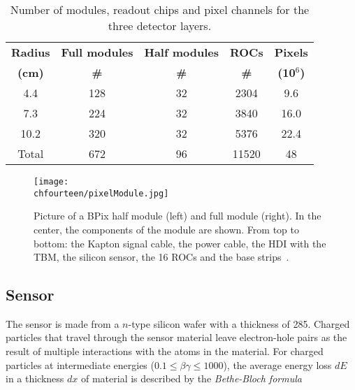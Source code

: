 \begin{table}[!htb]
  \caption{\small Number of modules, readout chips and pixel channels for the three detector layers.}
  \smallskip
  \centering
  \begin{tabular}{|c|c|c|c|c|}
    \hline
    {\bfseries Radius} & {\bfseries Full modules} & {\bfseries Half modules} & {\bfseries ROCs}  & {\bfseries Pixels}  \\
    {\bfseries (cm)}   & {\bfseries \#          } & {\bfseries \#          } & {\bfseries \#  }  & {\bfseries (10$^6$)}\\ \hline \hline
    4.4                & 128                      & 32                       & 2304              & 9.6     \\
    7.3                & 224                      & 32                       & 3840              & 16.0      \\ 
    10.2               & 320                      & 32                       & 5376              & 22.4    \\
    Total              & 672                      & 96                       & 11520             & 48      \\ \hline
  \end{tabular}
  \label{tab:Nmodules}
\end{table}

\begin{figure}[!htb]
 \begin{center}
 \texttt{[image: \\chfourteen/pixelModule.jpg]}
 \end{center}
 \caption{Picture of a BPix half module (left) and full module (right). In the center, the components of the module are shown. From top to bottom: the Kapton signal cable, the power cable, the HDI with the TBM, the silicon sensor, the 16 ROCs and the base strips~\cite{Konig200662}.}
 \label{fig:BpixMod}
\end{figure}

\subsection{Sensor}

The sensor is made from a $n$-type silicon wafer with a thickness of 285\mum.
Charged particles that travel through the sensor material leave electron-hole pairs as the result of multiple interactions with the atoms in the material.
For charged particles at intermediate energies ($0.1 \leq \beta\gamma \leq 1000$), the average energy loss $dE$ in a thickness $dx$ of material is described by the \textit{Bethe-Bloch formula}

